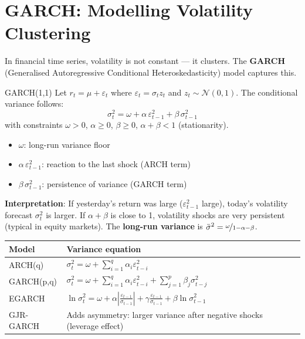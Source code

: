 \documentclass[12pt,a4paper,openany]{report}
\theoremstyle{definition}
\begin{document}
\section{GARCH: Modelling Volatility Clustering}
\label{sec:garch}

In financial time series, volatility is not constant — it clusters. The \textbf{GARCH} (Generalised Autoregressive Conditional Heteroskedasticity) model captures this.

\begin{definitionbox}{GARCH(1,1)}
Let $r_t = \mu + \varepsilon_t$ where $\varepsilon_t = \sigma_t z_t$ and $z_t \sim \mathcal{N}(0,1)$. The conditional variance follows:
\[
  \sigma_t^2 = \omega + \alpha\,\varepsilon_{t-1}^2 + \beta\,\sigma_{t-1}^2
\]
with constraints $\omega > 0$, $\alpha \geq 0$, $\beta \geq 0$, $\alpha + \beta < 1$ (stationarity).
\begin{itemize}
  \item $\omega$: long-run variance floor
  \item $\alpha\,\varepsilon_{t-1}^2$: reaction to the last shock (ARCH term)
  \item $\beta\,\sigma_{t-1}^2$: persistence of variance (GARCH term)
\end{itemize}
\end{definitionbox}

\textbf{Interpretation}: If yesterday's return was large ($\varepsilon_{t-1}^2$ large), today's volatility forecast $\sigma_t^2$ is larger. If $\alpha + \beta$ is close to 1, volatility shocks are very persistent (typical in equity markets). The \textbf{long-run variance} is $\bar{\sigma}^2 = \nicefrac{\omega}{1-\alpha-\beta}$.

\begin{center}
\begin{tabular}{ll}
\toprule
\textbf{Model} & \textbf{Variance equation} \\
\midrule
ARCH(q) & $\sigma_t^2 = \omega + \sum_{i=1}^q \alpha_i \varepsilon_{t-i}^2$ \\
GARCH(p,q) & $\sigma_t^2 = \omega + \sum_{i=1}^q \alpha_i \varepsilon_{t-i}^2 + \sum_{j=1}^p \beta_j \sigma_{t-j}^2$ \\
EGARCH & $\ln\sigma_t^2 = \omega + \alpha|\frac{\varepsilon_{t-1}}{\sigma_{t-1}}| + \gamma\frac{\varepsilon_{t-1}}{\sigma_{t-1}} + \beta\ln\sigma_{t-1}^2$ \\
GJR-GARCH & Adds asymmetry: larger variance after negative shocks (leverage effect) \\
\bottomrule
\end{tabular}
\end{center}
\end{document}
